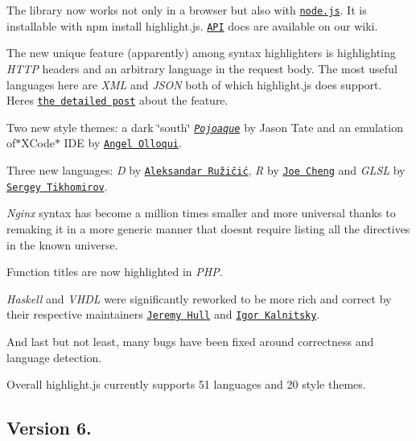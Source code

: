 \begin{DoxyItemize}
\item The library now works not only in a browser but also with \href{http://nodejs.org/}{\tt node.\+js}. It is installable with {\ttfamily npm install highlight.\+js}. \href{http://softwaremaniacs.org/wiki/doku.php/highlight.js:api}{\tt A\+PI} docs are available on our wiki.
\item The new unique feature (apparently) among syntax highlighters is highlighting {\itshape H\+T\+TP} headers and an arbitrary language in the request body. The most useful languages here are {\itshape X\+ML} and {\itshape J\+S\+ON} both of which highlight.\+js does support. Here\textquotesingle{}s \href{http://bazaar.launchpad.net/~isagalaev/+junk/highlight/annotate/342/src/wp_highlight.js.php}{\tt the detailed post} about the feature.
\item Two new style themes\+: a dark \char`\"{}south\char`\"{} {\itshape \href{http://web-cms-designs.com/ftopict-10-pojoaque-style-for-highlight-js-code-highlighter.html}{\tt Pojoaque}} by Jason Tate and an emulation of$\ast$\+X\+Code$\ast$ I\+DE by \href{https://github.com/angelolloqui}{\tt Angel Olloqui}.
\item Three new languages\+: {\itshape D} by \href{https://github.com/raleksandar}{\tt Aleksandar Ružičić}, {\itshape R} by \href{https://github.com/seejohnrun}{\tt Joe Cheng} and {\itshape G\+L\+SL} by \href{https://github.com/tikhomirov}{\tt Sergey Tikhomirov}.
\item {\itshape Nginx} syntax has become a million times smaller and more universal thanks to remaking it in a more generic manner that doesn\textquotesingle{}t require listing all the directives in the known universe.
\item Function titles are now highlighted in {\itshape P\+HP}.
\item {\itshape Haskell} and {\itshape V\+H\+DL} were significantly reworked to be more rich and correct by their respective maintainers \href{https://github.com/sourrust}{\tt Jeremy Hull} and \href{http://kalnitsky.org.ua/}{\tt Igor Kalnitsky}.
\end{DoxyItemize}

And last but not least, many bugs have been fixed around correctness and language detection.

Overall highlight.\+js currently supports 51 languages and 20 style themes.

\subsection*{Version 6.}

